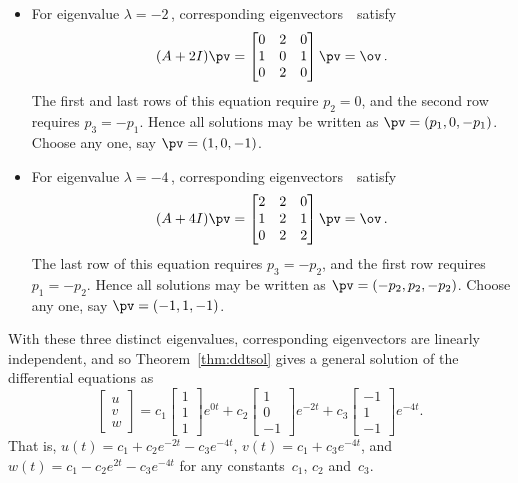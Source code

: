 \begin{example}
\begin{solution}
\begin{itemize}
\item For eigenvalue \(\lambda=-2\)\,, corresponding eigenvectors~\pv\ satisfy
\begin{equation*}
(A+2I)\pv=\begin{bmatrix} 0&2&0\\1&0&1\\0&2&0 \end{bmatrix}\pv=\ov\,.
\end{equation*}
The first and last rows of this equation require \(p_2=0\), and the second row requires \(p_3=-p_1\).
Hence all solutions may be written as \(\pv=(p_1,0,-p_1)\).
Choose any one, say \(\pv=(1,0,-1)\).

\item For eigenvalue \(\lambda=-4\)\,, corresponding eigenvectors~\pv\ satisfy
\begin{equation*}
(A+4I)\pv=\begin{bmatrix} 2&2&0\\1&2&1\\0&2&2 \end{bmatrix}\pv=\ov\,.
\end{equation*}
The last row of this equation requires \(p_3=-p_2\), and the first row requires \(p_1=-p_2\).
Hence all solutions may be written as \(\pv=(-p_2,p_2,-p_2)\).
Choose any one, say \(\pv=(-1,1,-1)\).

\end{itemize}
With these three distinct eigenvalues, corresponding eigenvectors are linearly independent, and so Theorem~\ref{thm:ddtsol} gives a general solution of the differential equations as
\begin{equation*}
\begin{bmatrix} u\\v\\w \end{bmatrix}
=c_1\begin{bmatrix} 1\\1\\1 \end{bmatrix}e^{0t}
+c_2\begin{bmatrix} 1\\0\\-1 \end{bmatrix}e^{-2t}
+c_3\begin{bmatrix} -1\\1\\-1 \end{bmatrix}e^{-4t}.
\end{equation*}
That is, \(u(t)=c_1+c_2e^{-2t}-c_3e^{-4t}\), \(v(t)=c_1+c_3e^{-4t}\), and \(w(t)=c_1-c_2e^{2t}-c_3e^{-4t}\) for any constants~\(c_1\), \(c_2\) and~\(c_3\).
\end{solution}
\end{example}





